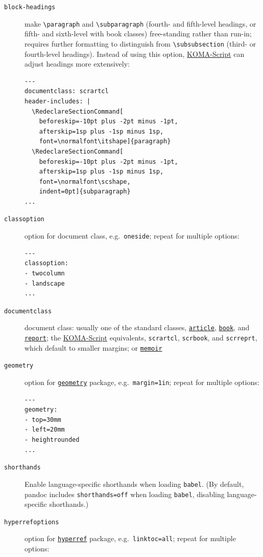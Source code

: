 \documentclass[
]{article}
\begin{document}
\begin{description}
\item[\texttt{block-headings}]
make \texttt{\textbackslash{}paragraph} and
\texttt{\textbackslash{}subparagraph} (fourth- and fifth-level headings,
or fifth- and sixth-level with book classes) free-standing rather than
run-in; requires further formatting to distinguish from
\texttt{\textbackslash{}subsubsection} (third- or fourth-level
headings). Instead of using this option,
\href{https://ctan.org/pkg/koma-script}{KOMA-Script} can adjust headings
more extensively:

\begin{verbatim}
---
documentclass: scrartcl
header-includes: |
  \RedeclareSectionCommand[
    beforeskip=-10pt plus -2pt minus -1pt,
    afterskip=1sp plus -1sp minus 1sp,
    font=\normalfont\itshape]{paragraph}
  \RedeclareSectionCommand[
    beforeskip=-10pt plus -2pt minus -1pt,
    afterskip=1sp plus -1sp minus 1sp,
    font=\normalfont\scshape,
    indent=0pt]{subparagraph}
...
\end{verbatim}
\item[\texttt{classoption}]
option for document class, e.g.~\texttt{oneside}; repeat for multiple
options:

\begin{verbatim}
---
classoption:
- twocolumn
- landscape
...
\end{verbatim}
\item[\texttt{documentclass}]
document class: usually one of the standard classes,
\href{https://ctan.org/pkg/article}{\texttt{article}},
\href{https://ctan.org/pkg/book}{\texttt{book}}, and
\href{https://ctan.org/pkg/report}{\texttt{report}}; the
\href{https://ctan.org/pkg/koma-script}{KOMA-Script} equivalents,
\texttt{scrartcl}, \texttt{scrbook}, and \texttt{scrreprt}, which
default to smaller margins; or
\href{https://ctan.org/pkg/memoir}{\texttt{memoir}}
\item[\texttt{geometry}]
option for \href{https://ctan.org/pkg/geometry}{\texttt{geometry}}
package, e.g.~\texttt{margin=1in}; repeat for multiple options:

\begin{verbatim}
---
geometry:
- top=30mm
- left=20mm
- heightrounded
...
\end{verbatim}
\item[\texttt{shorthands}]
Enable language-specific shorthands when loading \texttt{babel}. (By
default, pandoc includes \texttt{shorthands=off} when loading
\texttt{babel}, disabling language-specific shorthands.)
\item[\texttt{hyperrefoptions}]
option for \href{https://ctan.org/pkg/hyperref}{\texttt{hyperref}}
package, e.g.~\texttt{linktoc=all}; repeat for multiple options:


\end{description}
\end{document}
